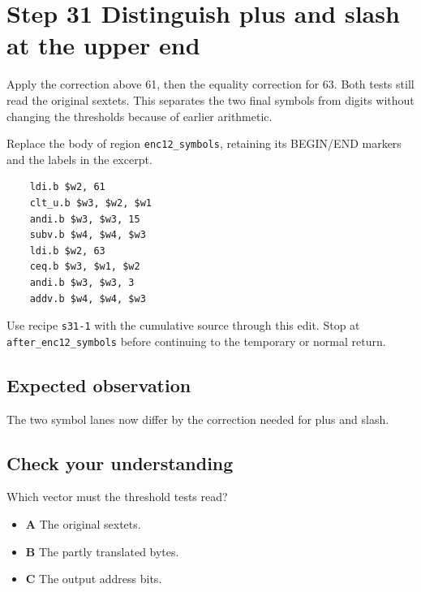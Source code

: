 \section{Step 31 Distinguish plus and slash at the upper end}\label{base64-s31}

Apply the correction above 61, then the equality correction for 63. Both tests still read the original sextets. This separates the two final symbols from digits without changing the thresholds because of earlier arithmetic.

Replace the body of region \texttt{enc12\_symbols}, retaining its BEGIN/END markers and the labels in the excerpt.

\begin{verbatim}
    ldi.b $w2, 61
    clt_u.b $w3, $w2, $w1
    andi.b $w3, $w3, 15
    subv.b $w4, $w4, $w3
    ldi.b $w2, 63
    ceq.b $w3, $w1, $w2
    andi.b $w3, $w3, 3
    addv.b $w4, $w4, $w3
\end{verbatim}

Use recipe \texttt{s31-1} with the cumulative source through this edit. Stop at \texttt{after\_enc12\_symbols} before continuing to the temporary or normal return.

\subsection{Expected observation}
The two symbol lanes now differ by the correction needed for plus and slash.

\subsection{Check your understanding}
Which vector must the threshold tests read?

\begin{itemize}
\item \textbf{A} The original sextets.
\item \textbf{B} The partly translated bytes.
\item \textbf{C} The output address bits.
\end{itemize}
